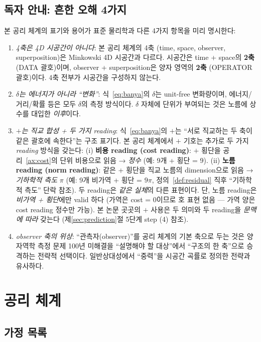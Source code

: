 \documentclass[entropy,article,submit,pdftex,oneauthor]{Definitions/mdpi}
\begin{document}
\subsection{독자 안내: 흔한 오해 4가지}

본 공리 체계의 표기와 용어가 표준 물리학과 다른 4가지 항목을 미리 명시한다:
\begin{enumerate}
\item \emph{4축은 4D 시공간이 아니다}: 본 공리 체계의 4축 (time, space, observer, superposition)은 Minkowski 4D 시공간과 다르다. 시공간은 time + space의 \textbf{2축} (DATA 괄호)이며, observer + superposition은 양자 영역의 \textbf{2축} (OPERATOR 괄호)이다. 4축 전부가 시공간을 구성하지 않는다.
\item \emph{$\delta$는 에너지가 아니라 ``변화''}: 식~\eqref{eq:banya}의 $\delta$는 unit-free 변화량이며, 에너지/거리/확률 등은 모두 $\delta$의 측정 방식이다. $\delta$ 자체에 단위가 부여되는 것은 노름에 상수를 대입한 \emph{이후}이다.
\item \emph{$+$는 직교 합성 + 두 가지 reading}: 식~\eqref{eq:banya}의 $+$는 ``서로 직교하는 두 축이 같은 괄호에 속한다''는 구조 표기다. 본 공리 체계에서 $+$ 기호는 추가로 두 가지 \emph{reading} 방식을 갖는다: (i) \textbf{비용 reading (cost reading)}: $+$ 횡단을 공리~\ref{ax:cost}의 단위 비용으로 읽음 → \emph{정수} (예: 9개 + 횡단 = 9). (ii) \textbf{노름 reading (norm reading)}: 같은 + 횡단을 직교 노름의 dimension으로 읽음 → \emph{기하학적 측도} $\pi$ (예: 9개 비가역 + 횡단 = $9\pi$, 정의~\ref{def:residual} 직후 ``기하학적 측도'' 단락 참조).
두 reading은 \emph{같은 실체}의 다른 표현이다. 단, 노름 reading은 \emph{비가역 + 횡단}에만 valid 하다 (가역은 cost = 0이므로 호 표현 없음 — 가역 양은 cost reading 정수만 가능). 본 논문 곳곳의 $+$ 사용은 두 의미와 두 reading을 \emph{문맥에 따라} 갖는다 (제\ref{sec:prediction}절 5단계 step (4) 참조).
\item \emph{observer 축의 위상}: ``관측자(observer)''를 공리 체계의 기본 축으로 두는 것은 양자역학 측정 문제 100년 미해결을 ``설명해야 할 대상''에서 ``구조의 한 축''으로 승격하는 전략적 선택이다. 일반상대성에서 ``중력''을 시공간 곡률로 정의한 전략과 유사하다.
\end{enumerate}

\section{공리 체계}
\label{sec:axioms}

\subsection{가정 목록}
\label{sec:assumption-list}
\end{document}
